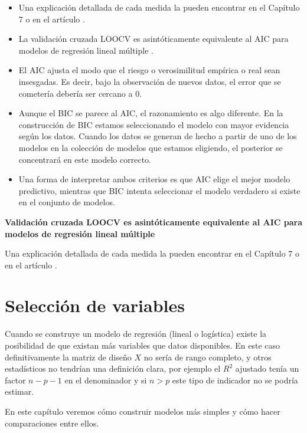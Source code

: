 \documentclass[
  12pt,
]{book}
\providecommand{\tightlist}{%
  \setlength{\itemsep}{0pt}\setlength{\parskip}{0pt}}
\theoremstyle{definition}
\theoremstyle{definition}
\theoremstyle{definition}
\theoremstyle{definition}
\theoremstyle{remark}
\begin{document}
\begin{itemize}
\tightlist
\item
  Una explicación detallada de cada medida la pueden encontrar en el Capítulo 7 \autocite{HastieElements2009} o en el artículo \autocite{CavanaughAkaike2019}.
\item
  La validación cruzada LOOCV es asintóticamente equivalente al AIC para modelos de regresión lineal múltiple \autocite{StoneAsymptotic1977}.
\item
  El AIC ajusta el modo que el riesgo o verosimilitud empírica o real sean insesgadas. Es decir, bajo la observación de nuevos datos, el error que se cometería debería ser cercano a 0.
\item
  Aunque el BIC se parece al AIC, el razonamiento es algo diferente. En la construcción de BIC estamos seleccionando el modelo con mayor evidencia según los datos. Cuando los datos se generan de hecho a partir de uno de los modelos en la colección de modelos que estamos eligiendo, el posterior se concentrará en este modelo correcto.\\
\item
  Una forma de interpretar ambos criterios es que AIC elige el mejor modelo predictivo, mientras que BIC intenta seleccionar el modelo verdadero si existe en el conjunto de modelos.
\end{itemize}

\textbf{Validación cruzada LOOCV es asintóticamente equivalente al AIC para modelos de regresión lineal múltiple \autocite{StoneAsymptotic1977}}

Una explicación detallada de cada medida la pueden encontrar en el Capítulo 7 \autocite{HastieElements2009} o en el artículo \autocite{CavanaughAkaike2019}.

\hypertarget{selecciuxf3n-de-variables}{%
\section{Selección de variables}\label{selecciuxf3n-de-variables}}

Cuando se construye un modelo de regresión (lineal o logística) existe la posibilidad de que existan más variables que datos disponibles. En este caso definitivamente la matriz de diseño \(X\) no sería de rango completo, y otros estadísticos no tendrían una definición clara, por ejemplo el \(R^{2}\) ajustado tenía un factor \(n-p-1\) en el denominador y si \(n>p\) este tipo de indicador no se podría estimar.

En este capítulo veremos cómo construir modelos más simples y cómo hacer comparaciones entre ellos.
\end{document}

